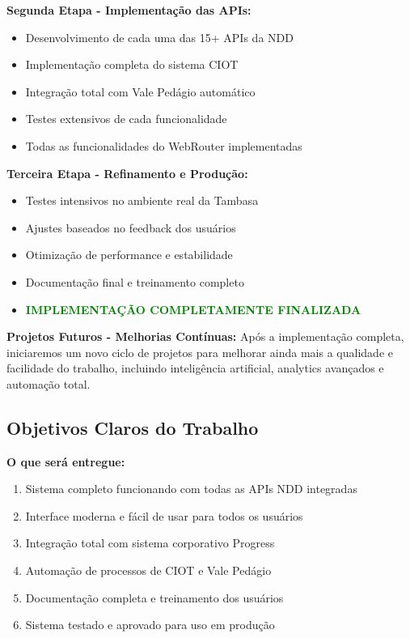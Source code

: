 \documentclass[12pt,a4paper]{article}
\begin{document}
\textbf{Segunda Etapa - Implementação das APIs:}
\begin{itemize}
    \item Desenvolvimento de cada uma das 15+ APIs da NDD
    \item Implementação completa do sistema CIOT
    \item Integração total com Vale Pedágio automático
    \item Testes extensivos de cada funcionalidade
    \item Todas as funcionalidades do WebRouter implementadas
\end{itemize}

\textbf{Terceira Etapa - Refinamento e Produção:}
\begin{itemize}
    \item Testes intensivos no ambiente real da Tambasa
    \item Ajustes baseados no feedback dos usuários
    \item Otimização de performance e estabilidade
    \item Documentação final e treinamento completo
    \item \textcolor{green}{\textbf{IMPLEMENTAÇÃO COMPLETAMENTE FINALIZADA}}
\end{itemize}

\textbf{Projetos Futuros - Melhorias Contínuas:}
Após a implementação completa, iniciaremos um novo ciclo de projetos para melhorar ainda mais a qualidade e facilidade do trabalho, incluindo inteligência artificial, analytics avançados e automação total.

\subsection*{Objetivos Claros do Trabalho}

\textbf{O que será entregue:}
\begin{enumerate}
    \item Sistema completo funcionando com todas as APIs NDD integradas
    \item Interface moderna e fácil de usar para todos os usuários
    \item Integração total com sistema corporativo Progress
    \item Automação de processos de CIOT e Vale Pedágio
    \item Documentação completa e treinamento dos usuários
    \item Sistema testado e aprovado para uso em produção
\end{enumerate}
\end{document}
